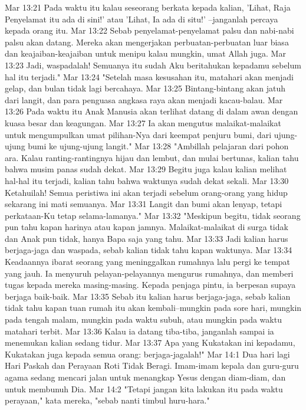 Mar 13:21  Pada waktu itu kalau seseorang berkata kepada kalian, 'Lihat, Raja Penyelamat itu ada di sini!' atau 'Lihat, Ia ada di situ!' --janganlah percaya kepada orang itu.
Mar 13:22  Sebab penyelamat-penyelamat palsu dan nabi-nabi palsu akan datang. Mereka akan mengerjakan perbuatan-perbuatan luar biasa dan keajaiban-keajaiban untuk menipu kalau mungkin, umat Allah juga.
Mar 13:23  Jadi, waspadalah! Semuanya itu sudah Aku beritahukan kepadamu sebelum hal itu terjadi."
Mar 13:24  "Setelah masa kesusahan itu, matahari akan menjadi gelap, dan bulan tidak lagi bercahaya.
Mar 13:25  Bintang-bintang akan jatuh dari langit, dan para penguasa angkasa raya akan menjadi kacau-balau.
Mar 13:26  Pada waktu itu Anak Manusia akan terlihat datang di dalam awan dengan kuasa besar dan keagungan.
Mar 13:27  Ia akan mengutus malaikat-malaikat untuk mengumpulkan umat pilihan-Nya dari keempat penjuru bumi, dari ujung-ujung bumi ke ujung-ujung langit."
Mar 13:28  "Ambillah pelajaran dari pohon ara. Kalau ranting-rantingnya hijau dan lembut, dan mulai bertunas, kalian tahu bahwa musim panas sudah dekat.
Mar 13:29  Begitu juga kalau kalian melihat hal-hal itu terjadi, kalian tahu bahwa waktunya sudah dekat sekali.
Mar 13:30  Ketahuilah! Semua peristiwa ini akan terjadi sebelum orang-orang yang hidup sekarang ini mati semuanya.
Mar 13:31  Langit dan bumi akan lenyap, tetapi perkataan-Ku tetap selama-lamanya."
Mar 13:32  "Meskipun begitu, tidak seorang pun tahu kapan harinya atau kapan jamnya. Malaikat-malaikat di surga tidak dan Anak pun tidak, hanya Bapa saja yang tahu.
Mar 13:33  Jadi kalian harus berjaga-jaga dan waspada, sebab kalian tidak tahu kapan waktunya.
Mar 13:34  Keadaannya ibarat seorang yang meninggalkan rumahnya lalu pergi ke tempat yang jauh. Ia menyuruh pelayan-pelayannya mengurus rumahnya, dan memberi tugas kepada mereka masing-masing. Kepada penjaga pintu, ia berpesan supaya berjaga baik-baik.
Mar 13:35  Sebab itu kalian harus berjaga-jaga, sebab kalian tidak tahu kapan tuan rumah itu akan kembali--mungkin pada sore hari, mungkin pada tengah malam, mungkin pada waktu subuh, atau mungkin pada waktu matahari terbit.
Mar 13:36  Kalau ia datang tiba-tiba, janganlah sampai ia menemukan kalian sedang tidur.
Mar 13:37  Apa yang Kukatakan ini kepadamu, Kukatakan juga kepada semua orang: berjaga-jagalah!"
Mar 14:1  Dua hari lagi Hari Paskah dan Perayaan Roti Tidak Beragi. Imam-imam kepala dan guru-guru agama sedang mencari jalan untuk menangkap Yesus dengan diam-diam, dan untuk membunuh Dia.
Mar 14:2  "Tetapi jangan kita lakukan itu pada waktu perayaan," kata mereka, "sebab nanti timbul huru-hara."
